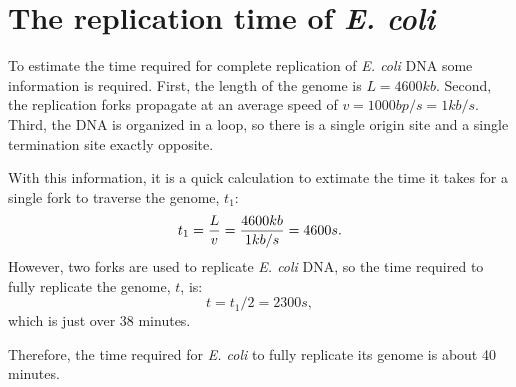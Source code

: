 \chapter{The replication time of \emph{E. coli}}
\label{ap:EColi}

To estimate the time required for complete replication of \emph{E. coli} DNA some information is required.
First, the length of the genome is $L = 4600 kb$.
Second, the replication forks propagate at an average speed of $v = 1000 bp/s = 1 kb/s$.
Third, the DNA is organized in a loop, so there is a single origin site and a single termination site exactly opposite. \cite{EColi}

With this information, it is a quick calculation to extimate the time it takes for a single fork to traverse the genome, $t_1$:
$$
	t_1 = {{L}\over{v}} = {{4600 kb}\over{1 kb/s}} = 4600 s.
$$
However, two forks are used to replicate \emph{E. coli} DNA, so the time required to fully replicate the genome, $t$, is:
$$
	t = t_1/2 = 2300 s,
$$
which is just over 38 minutes.

Therefore, the time required for \emph{E. coli} to fully replicate its genome is about 40 minutes.